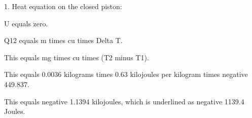 1. Heat equation on the closed piston:

U equals zero.

Q12 equals m times cu times Delta T.

This equals mg times cu times (T2 minus T1).

This equals 0.0036 kilograms times 0.63 kilojoules per kilogram times negative 449.837.

This equals negative 1.1394 kilojoules, which is underlined as negative 1139.4 Joules.